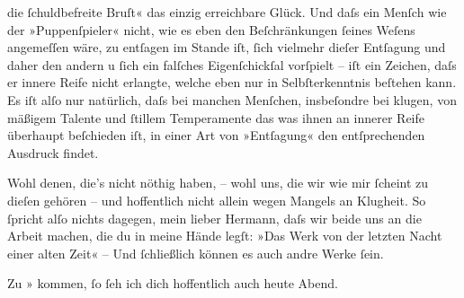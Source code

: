               die{ }ſchuldbefreite Bruſt« das einzig erreichbare Glück. Und daſs ein Menſch wie der
                  »Puppenſpieler« nicht, wie
               es eben den Beſchränkungen{ }ſeines Weſens angemeſſen wäre, \introOben{}zu\introOben{}
               entſagen im Stande iſt,{ }ſich \introOben{}vielmehr\introOben{} dieſer Entſagung
               und daher den andern u{ }ſich ein \introOben{}falſches\introOben{} Eigenſchickſal
               vorſpielt – iſt ein Zeichen, daſs er innere Reife nicht erlangte, welche eben nur in
               Selbſterkenntnis beſtehen kann.  Es iſt {\pb}alſo nur natürlich,
               daſs bei manchen Menſchen, insbeſondre bei klugen, von mäßigem Talente und{ }ſtillem
               Temperamente das was ihnen an innerer Reife überhaupt beſchieden iſt, in einer Art
               von »Entſagung« den entſprechenden Ausdruck findet.\pend
           
\pstart
           Wohl denen, die’s nicht nöthig haben, – wohl uns, die wir wie mir{ }ſcheint zu dieſen
               gehören – und hoffentlich nicht allein wegen Mangels an Klugheit. So{ }ſpricht alſo
               nichts dagegen, mein lieber Hermann, daſs wir beide uns an die Arbeit machen, die du
               in meine {\pb}Hände legſt:
                  »\label{LL075-1v}Das Werk von der letzten Nacht einer alten
                  Zeit\label{LL075-1h}« – Und{ }ſchließlich können es auch andre Werke{ }ſein.\pend
           
\pstart
           Zu »\label{K_L01477-4v}\label{K_L01477-4}{ }kommen,{ }ſo{ }ſeh ich dich hoffentlich auch heute Abend.\pend
           
